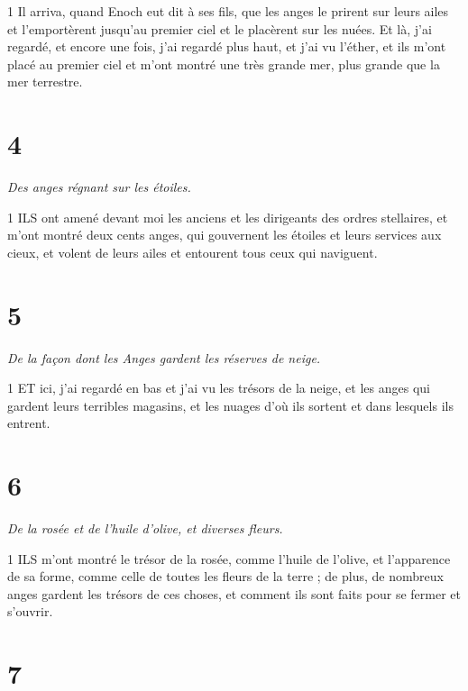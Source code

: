 \par 1 Il arriva, quand Enoch eut dit à ses fils, que les anges le prirent sur leurs ailes et l'emportèrent jusqu'au premier ciel et le placèrent sur les nuées. Et là, j'ai regardé, et encore une fois, j'ai regardé plus haut, et j'ai vu l'éther, et ils m'ont placé au premier ciel et m'ont montré une très grande mer, plus grande que la mer terrestre.

\chapter{4}

\par \textit{Des anges régnant sur les étoiles.}

\par 1 ILS ont amené devant moi les anciens et les dirigeants des ordres stellaires, et m'ont montré deux cents anges, qui gouvernent les étoiles et leurs services aux cieux, et volent de leurs ailes et entourent tous ceux qui naviguent.

\chapter{5}

\par \textit{De la façon dont les Anges gardent les réserves de neige.}

\par 1 ET ici, j'ai regardé en bas et j'ai vu les trésors de la neige, et les anges qui gardent leurs terribles magasins, et les nuages ​​d'où ils sortent et dans lesquels ils entrent.

\chapter{6}

\par \textit{De la rosée et de l'huile d'olive, et diverses fleurs.}

\par 1 ILS m'ont montré le trésor de la rosée, comme l'huile de l'olive, et l'apparence de sa forme, comme celle de toutes les fleurs de la terre ; de plus, de nombreux anges gardent les trésors de ces choses, et comment ils sont faits pour se fermer et s'ouvrir.

\chapter{7}

